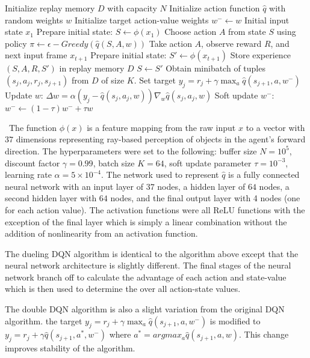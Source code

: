 \documentclass[12]{article}
\begin{document}
\begin{algorithmic}[1]
\State Initialize replay memory $D$ with capacity $N$
\State Initialize action function $\hat{q}$ with random weights $w$ 
\State Initialize target action-value weights $w^{-} \leftarrow w$
 	\State Initial input state $x_1$
	\State Prepare initial state: $S \leftarrow \phi(x_1)$
		\State Choose action $A$ from state $S$ using policy $\pi \leftarrow \epsilon-Greedy(\hat{q}(S,A,w))$
		\State Take action $A$, observe reward $R$, and next input frame $x_{t+1}$
		\State Prepare initial state: $S' \leftarrow \phi(x_{t+1})$
		\State Store experience $(S,A,R,S')$ in replay memory $D$
		\State $S \leftarrow S'$
		\State Obtain minibatch of tuples $(s_j,a_j,r_j,s_{j+1})$ from $D$ of size $K$.
		\State Set target $y_j = r_j + \gamma \max_a \hat{q}(s_{j+1}, a, w^{-})$
		\State Update $w$: $\Delta w = \alpha (y_j - \hat{q} (s_j, a_j, w))\nabla_w \hat{q}(s_j,a_j,w)$
		\State Soft update $w^{-}$: $w^{-} \leftarrow (1-\tau) w^{-} + \tau w$ 
	\EndFor
\EndFor
\end{algorithmic}

\
The function $\phi(x)$ is a feature mapping from the raw input $x$ to a vector with $37$ dimensions representing ray-based perception of objects in the agent's forward direction. The hyperparameters were set to the following: buffer size $ N = 10^{5}$, discount factor $\gamma = 0.99$, batch size $K = 64$, soft update parameter $\tau = 10^{-3}$, learning rate $\alpha =5 \times 10^{-4}$. The network used to represent $\hat{q}$ is a fully connected neural network with an input layer of $37$ nodes, a hidden layer of $64$ nodes, a second hidden layer with $64$ nodes, and the final output layer with 4 nodes (one for each action value). The activation functions were all ReLU functions with the exception of the final layer which is simply a linear combination without the addition of nonlinearity from an activation function.

The dueling DQN algorithm is identical to the algorithm above except that the neural network architecture is slightly different. The final stages of the neural network branch off to calculate the advantage of each action and state-value which is then used to determine the over all action-state values.

The double DQN algorithm is also a slight variation from the original DQN algorithm. the target $y_j = r_j + \gamma \max_a \hat{q}(s_{j+1}, a, w^{-})$ is modified to $y_j = r_j + \gamma \hat{q}(s_{j+1}, a^{*}, w^{-})$ where $a^{*} = argmax_a \hat{q}(s_{j+1},a,w)$. This change improves stability of the algorithm.
\end{document}
